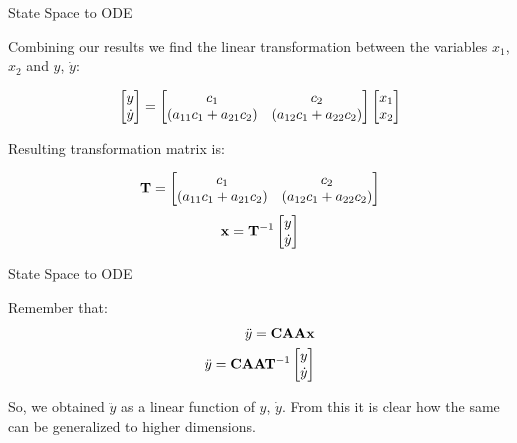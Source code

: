 \documentclass{beamer}
\begin{document}
\begin{frame}{State Space to ODE}
\begin{flushleft}

Combining our results we find the linear transformation between the variables $x_1$, $x_2$ and $y$, $\dot y$:

\begin{equation}
\begin{bmatrix} y \\ \dot y \end{bmatrix} = 
\begin{bmatrix}
	c_1                                     & c_2 \\ 
	(a_{11}c_1 + a_{21}c_2) & (a_{12}c_1 + a_{22}c_2)
\end{bmatrix} 
\begin{bmatrix} x_1 \\ x_2 \end{bmatrix}    
\end{equation}

Resulting transformation matrix is:

\begin{equation}
\mathbf{T} = 
\begin{bmatrix}
	c_1                                     & c_2 \\ 
	(a_{11}c_1 + a_{21}c_2) & (a_{12}c_1 + a_{22}c_2)
\end{bmatrix} 
\end{equation}
\begin{equation}
	 \mathbf{x}
= 
	\mathbf{T}^{-1}
	\begin{bmatrix}
		y \\ 
		\dot y
	\end{bmatrix} 
\end{equation}

\end{flushleft}
\end{frame}



\begin{frame}{State Space to ODE}
\begin{flushleft}

Remember that:
%
\begin{align}
	\ddot y = \mathbf{C} \mathbf{A} \mathbf{A} \mathbf{x}
	\\
    \ddot y = \mathbf{C} \mathbf{A} \mathbf{A} \mathbf{T}^{-1} 
    \begin{bmatrix}
    	y \\ 
    	\dot y
    \end{bmatrix}
\end{align}

So, we obtained $\ddot y$ as a linear function of $y$, $\dot y$.       From this it is clear how the same can be generalized to higher dimensions.

\end{flushleft}
\end{frame}
\end{document}
